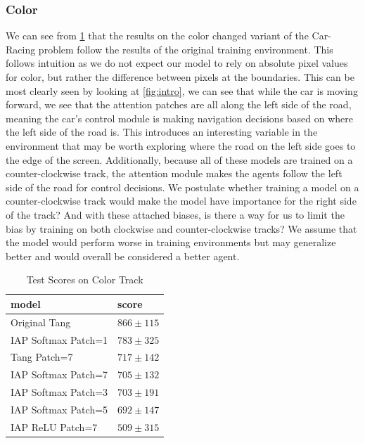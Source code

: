 \documentclass[10pt,twocolumn,letterpaper]{article}
\begin{document}
\subsubsection{Color}
We can see from \ref{tab:color} that the results on the color changed variant of the
Car-Racing problem follow the results of the original training environment. This follows 
intuition as we do not expect our model to rely on absolute pixel values for color, but
rather the difference between pixels at the boundaries. This can be most clearly seen 
by looking at \ref{fig:intro}, we can see that while the car is moving forward, we 
see that the attention patches are all along the left side of the road, meaning the car's 
control module is making navigation decisions based on where the left side of the road 
is. This introduces an interesting variable in the environment that may be worth exploring
where the road on the left side goes to the edge of the screen. Additionally,
because all of these models are trained on a counter-clockwise track, the attention module
makes the agents follow the left side of the road for control decisions. We postulate
whether training a model on a counter-clockwise track would make the model have importance
for the right side of the track? And with these attached biases, is there a way for us to 
limit the bias by training on both clockwise and counter-clockwise tracks? We assume that the
model would perform worse in training environments but may generalize better and would
overall be considered a better agent.
\begin{table}
\centering
\caption{\label{tab:color}Test Scores  on Color Track}
\begin{tabular}{|l|l|}
\hline
model               & score \\ \hline
Original Tang       & $866 \pm 115$  \\ \hline
IAP Softmax Patch=1 & $783 \pm 325$  \\ \hline
Tang Patch=7        & $717 \pm 142$   \\ \hline
IAP Softmax Patch=7 & $705 \pm 132$   \\ \hline
IAP Softmax Patch=3 & $703 \pm 191$  \\ \hline
IAP Softmax Patch=5 & $692 \pm 147$  \\ \hline
IAP ReLU Patch=7    & $509 \pm 315$  \\ \hline
\end{tabular}
\end{table}
\end{document}
